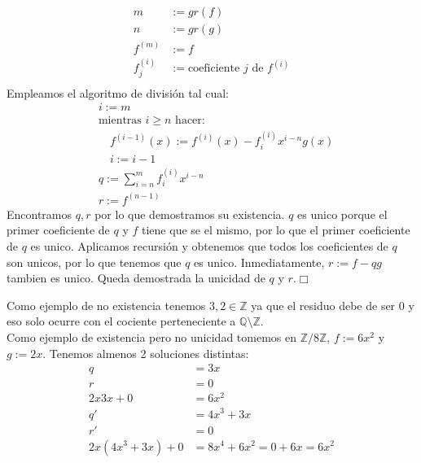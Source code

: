\begin{solution}
\begin{align}
m&:= gr(f)\\
n&:= gr(g)\\
f^{(m)}&:= f\\
f^{(i)}_j &:= \text{coeficiente $j$ de $f^{(i)}$}\\
\end{align}
Empleamos el algoritmo de división tal cual:
\begin{align}
&i:=m\\
&\text{mientras $i \ge n$ hacer:}\\
&\quad f^{(i-1)}(x) := f^{(i)}(x) - f^{(i)}_ix^{i-n}g(x)\\
&\quad i:= i - 1\\
&q:=\sum_{i=n}^{m} f^{(i)}_ix^{i-n}\\
&r:=f^{(n-1)}
\end{align}
Encontramos $q,r$ por lo que demostramos su existencia. 
$q$ es unico porque el primer coeficiente de $q$ y $f$ tiene que se el mismo, 
por lo que el primer coeficiente de $q$ es unico. 
Aplicamos recursión y obtenemos que todos los coeficientes de $q$ son unicos,
por lo que tenemos que $q$ es unico. 
Inmediatamente, $r := f-qg$ tambien es unico. 
Queda demostrada la unicidad de $q$ y $r$.$\Box$

Como ejemplo de no existencia tenemos $3,2\in\mathbb{Z}$ ya que 
el residuo debe de ser 0 y eso solo ocurre con
el cociente perteneciente a $\mathbb{Q}\setminus\mathbb{Z}$.\\
Como ejemplo de existencia pero no unicidad tomemos en $\mathbb{Z}/8\mathbb{Z}$,
$f:=6x^2$ y $g:=2x$. Tenemos almenos 2 soluciones distintas:
\begin{align}
q&=3x\\
r&=0\\
2x3x+0 &= 6x^2\\
q'&=4x^3+3x\\
r'&=0\\
2x(4x^3+3x)+0 &= 8x^4 + 6x^2 = 0 + 6x = 6x^2 
\end{align}
\end{solution}